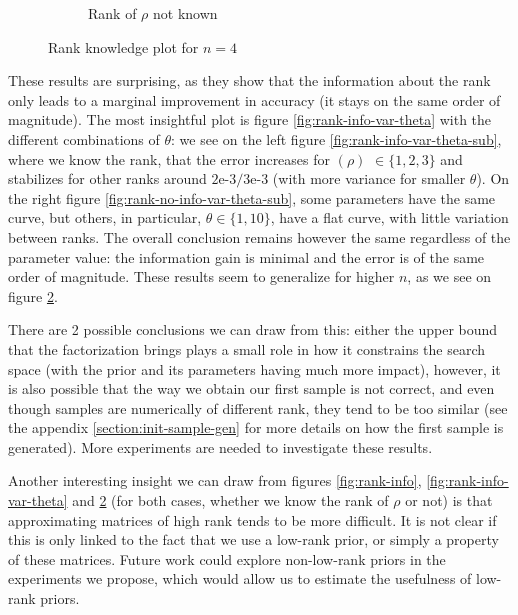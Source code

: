 \documentclass[12pt]{memoir}
\newcommand{\rhorank}[0]{\text{rank}$(\rho) $ }
\begin{document}
\begin{figure}[H]
\begin{subfigure}[b]{0.49\textwidth}
        \caption{Rank of $\rho$ not known}

        \label{fig:rank-no-info-n4-sub}

    \end{subfigure}

    \caption{Rank knowledge plot for $n=4$}

    \label{fig:rank-info-n4}

\end{figure}


These results are surprising, as they show that the information about the rank only leads to a marginal improvement in accuracy (it stays on the same order of magnitude). The most insightful plot is figure \ref{fig:rank-info-var-theta} with the different combinations of $\theta$: we see on the left figure \ref{fig:rank-info-var-theta-sub}, where we know the rank, that the error increases for \rhorank{$\in \{1,2,3\}$} and stabilizes for other ranks around $2\text{e-}3/3\text{e-}3$ (with more variance for smaller $\theta$). On the right figure \ref{fig:rank-no-info-var-theta-sub}, some parameters have the same curve, but others, in particular, $\theta \in\{1,10\}$, have a flat curve, with little variation between ranks. The overall conclusion remains however the same regardless of the parameter value: the information gain is minimal and the error is of the same order of magnitude.
These results seem to generalize for higher $n$, as we see on figure \ref{fig:rank-info-n4}. \medbreak


There are 2 possible conclusions we can draw from this: either the upper bound that the factorization brings plays a small role in how it constrains the search space (with the prior and its parameters having much more impact), however, it is also possible that the way we obtain our first sample is not correct, and even though samples are numerically of different rank, they tend to be too similar (see the appendix \ref{section:init-sample-gen} for more details on how the first sample is generated). More experiments are needed to investigate these results.\medbreak


Another interesting insight we can draw from figures \ref{fig:rank-info}, \ref{fig:rank-info-var-theta} and \ref{fig:rank-info-n4} (for both cases, whether we know the rank of $\rho$ or not) is that approximating matrices of high rank tends to be more difficult. It is not clear if this is only linked to the fact that we use a low-rank prior, or simply a property of these matrices. Future work could explore non-low-rank priors in the experiments we propose, which would allow us to estimate the usefulness of low-rank priors.
\end{document}
